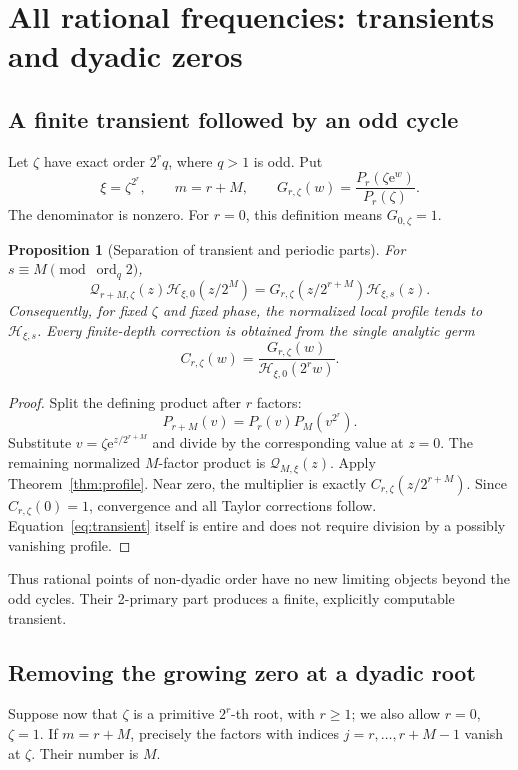 \documentclass[11pt,letterpaper]{article}
\numberwithin{equation}{section}
\newtheorem{proposition}[theorem]{Proposition}
\theoremstyle{definition}
\theoremstyle{remark}
\newcommand{\ord}{\operatorname{ord}}
\newcommand{\Hp}{\mathcal H}
\newcommand{\Qp}{\mathcal Q}
\newcommand{\e}{\mathrm e}
\begin{document}
\section{All rational frequencies: transients and dyadic zeros}
\label{sec:dyadic}

\subsection{A finite transient followed by an odd cycle}
Let \(\zeta\) have exact order \(2^rq\), where \(q>1\) is odd. Put
\[
 \xi=\zeta^{2^r},\qquad m=r+M,\qquad
 G_{r,\zeta}(w)=\frac{P_r(\zeta\e^w)}{P_r(\zeta)}.
\]
The denominator is nonzero. For \(r=0\), this definition means \(G_{0,\zeta}=1\).

\begin{proposition}[Separation of transient and periodic parts]
For \(s\equiv M\pmod{\ord_q2}\),
\begin{equation}
 \Qp_{r+M,\zeta}(z)\Hp_{\xi,0}(z/2^M)
 =G_{r,\zeta}(z/2^{r+M})\Hp_{\xi,s}(z).
 \label{eq:transient}
\end{equation}
Consequently, for fixed \(\zeta\) and fixed phase, the normalized local profile tends to \(\Hp_{\xi,s}\). Every finite-depth correction is obtained from the single analytic germ
\begin{equation}
 C_{r,\zeta}(w)=\frac{G_{r,\zeta}(w)}{\Hp_{\xi,0}(2^rw)}.
 \label{eq:transientcorrection}
\end{equation}
\end{proposition}
\begin{proof}
Split the defining product after \(r\) factors:
\[
 P_{r+M}(v)=P_r(v)P_M(v^{2^r}).
\]
Substitute \(v=\zeta\e^{z/2^{r+M}}\) and divide by the corresponding value at \(z=0\). The remaining normalized \(M\)-factor product is \(\Qp_{M,\xi}(z)\). Apply Theorem~\ref{thm:profile}. Near zero, the multiplier is exactly \(C_{r,\zeta}(z/2^{r+M})\). Since \(C_{r,\zeta}(0)=1\), convergence and all Taylor corrections follow. Equation~\eqref{eq:transient} itself is entire and does not require division by a possibly vanishing profile.
\end{proof}

Thus rational points of non-dyadic order have no new limiting objects beyond the odd cycles. Their 2-primary part produces a finite, explicitly computable transient.

\subsection{Removing the growing zero at a dyadic root}
Suppose now that \(\zeta\) is a primitive \(2^r\)-th root, with \(r\geq1\); we also allow \(r=0\), \(\zeta=1\). If \(m=r+M\), precisely the factors with indices \(j=r,\ldots,r+M-1\) vanish at \(\zeta\). Their number is \(M\).
\end{document}
